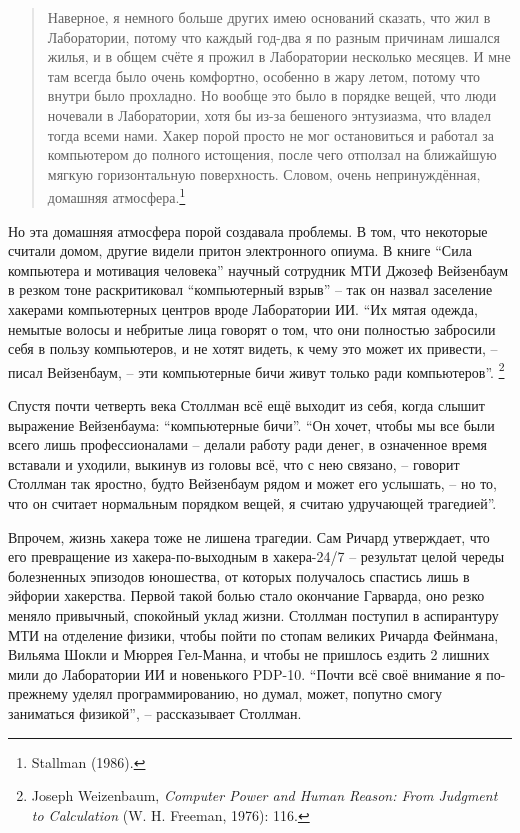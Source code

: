 \begin{quote}
Наверное, я немного больше других имею оснований сказать, что жил в Лаборатории, потому что каждый год-два я по разным причинам лишался жилья, и в общем счёте я прожил в Лаборатории несколько месяцев. И мне там всегда было очень комфортно, особенно в жару летом, потому что внутри было прохладно. Но вообще это было в порядке вещей, что люди ночевали в Лаборатории, хотя бы из-за бешеного энтузиазма, что владел тогда всеми нами. Хакер порой просто не мог остановиться и работал за компьютером до полного истощения, после чего отползал на ближайшую мягкую горизонтальную поверхность. Словом, очень непринуждённая, домашняя атмосфера.\footnote{Stallman (1986).}
\end{quote}

Но эта домашняя атмосфера порой создавала проблемы. В том, что некоторые считали домом, другие видели притон электронного опиума. В книге \enquote{Сила компьютера и мотивация человека} научный сотрудник МТИ Джозеф Вейзенбаум в резком тоне раскритиковал \enquote{компьютерный взрыв} -- так он назвал заселение хакерами компьютерных центров вроде Лаборатории ИИ. \enquote{Их мятая одежда, немытые волосы и небритые лица говорят о том, что они полностью забросили себя в пользу компьютеров, и не хотят видеть, к чему это может их привести, -- писал Вейзенбаум, -- эти компьютерные бичи живут только ради компьютеров}. \footnote{Joseph Weizenbaum, \textit{Computer Power and Human Reason: From Judgment to Calculation} (W. H. Freeman, 1976): 116.}

Спустя почти четверть века Столлман всё ещё выходит из себя, когда слышит выражение Вейзенбаума: \enquote{компьютерные бичи}. \enquote{Он хочет, чтобы мы все были всего лишь профессионалами -- делали работу ради денег, в означенное время вставали и уходили, выкинув из головы всё, что с нею связано, -- говорит Столлман так яростно, будто Вейзенбаум рядом и может его услышать, -- но то, что он считает нормальным порядком вещей, я считаю удручающей трагедией}.

Впрочем, жизнь хакера тоже не лишена трагедии. Сам Ричард утверждает, что его превращение из хакера-по-выходным в хакера-24/7 -- результат целой череды болезненных эпизодов юношества, от которых получалось спастись лишь в эйфории хакерства. Первой такой болью стало окончание Гарварда, оно резко меняло привычный, спокойный уклад жизни. Столлман поступил в аспирантуру МТИ на отделение физики, чтобы пойти по стопам великих Ричарда Фейнмана, Вильяма Шокли и Мюррея Гел-Манна, и чтобы не пришлось ездить 2 лишних мили до Лаборатории ИИ и новенького PDP-10. \enquote{Почти всё своё внимание я по-прежнему уделял программированию, но думал, может, попутно смогу заниматься физикой}, -- рассказывает Столлман.

